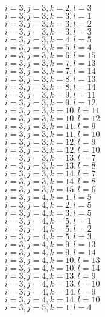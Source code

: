\documentclass[14pt]{article}
\begin{document}
    $i=3,j=3,k=2,l=3 $ \\ 
    $i=3,j=3,k=3,l=1 $ \\ 
    $i=3,j=3,k=3,l=2 $ \\ 
    $i=3,j=3,k=3,l=3 $ \\ 
    $i=3,j=3,k=4,l=5 $ \\ 
    $i=3,j=3,k=5,l=4 $ \\ 
    $i=3,j=3,k=6,l=15 $ \\ 
    $i=3,j=3,k=7,l=13 $ \\ 
    $i=3,j=3,k=7,l=14 $ \\ 
    $i=3,j=3,k=8,l=13 $ \\ 
    $i=3,j=3,k=8,l=14 $ \\ 
    $i=3,j=3,k=9,l=11 $ \\ 
    $i=3,j=3,k=9,l=12 $ \\ 
    $i=3,j=3,k=10,l=11 $ \\ 
    $i=3,j=3,k=10,l=12 $ \\ 
    $i=3,j=3,k=11,l=9 $ \\ 
    $i=3,j=3,k=11,l=10 $ \\ 
    $i=3,j=3,k=12,l=9 $ \\ 
    $i=3,j=3,k=12,l=10 $ \\ 
    $i=3,j=3,k=13,l=7 $ \\ 
    $i=3,j=3,k=13,l=8 $ \\ 
    $i=3,j=3,k=14,l=7 $ \\ 
    $i=3,j=3,k=14,l=8 $ \\ 
    $i=3,j=3,k=15,l=6 $ \\ 
    $i=3,j=4,k=1,l=5 $ \\ 
    $i=3,j=4,k=2,l=5 $ \\ 
    $i=3,j=4,k=3,l=5 $ \\ 
    $i=3,j=4,k=5,l=1 $ \\ 
    $i=3,j=4,k=5,l=2 $ \\ 
    $i=3,j=4,k=5,l=3 $ \\ 
    $i=3,j=4,k=9,l=13 $ \\ 
    $i=3,j=4,k=9,l=14 $ \\ 
    $i=3,j=4,k=10,l=13 $ \\ 
    $i=3,j=4,k=10,l=14 $ \\ 
    $i=3,j=4,k=13,l=9 $ \\ 
    $i=3,j=4,k=13,l=10 $ \\ 
    $i=3,j=4,k=14,l=9 $ \\ 
    $i=3,j=4,k=14,l=10 $ \\ 
    $i=3,j=5,k=1,l=4 $ \\ 
\end{document}
